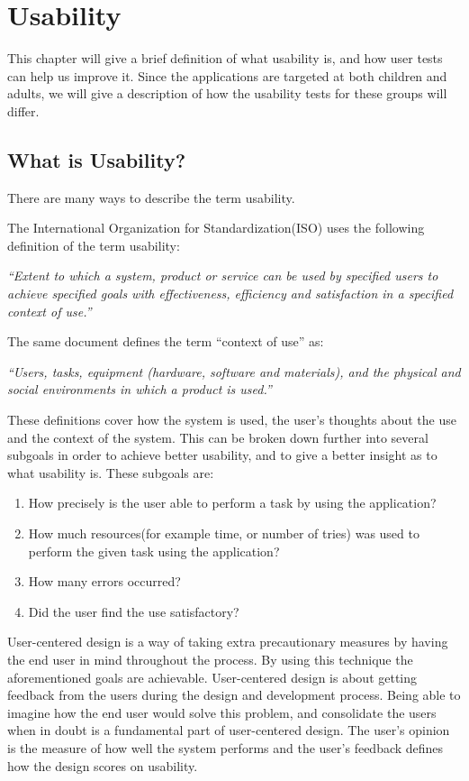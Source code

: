 \chapter{Usability}
\label{chp:usability}

This chapter will give a brief definition of what usability is, and how user tests can help us improve it. Since the applications are targeted at both children and adults, we will give a description of how the usability tests for these groups will differ.

\section{What is Usability?}
\label{sec:usability}
There are many ways to describe the term usability. 

The International Organization for Standardization(ISO) uses the following definition of the term usability\cite{isousability}:

\textit{``Extent to which a system, product or service can be used by specified
users to achieve specified goals with effectiveness, efficiency
and satisfaction in a specified context of use.''}

The same document defines the term ``context of use'' as:

\textit{``Users, tasks, equipment (hardware, software and materials), and
the physical and social environments in which a product is used.''}

These definitions cover how the system is used, the user's thoughts about the use and the context of the system. This can be broken down further into several subgoals in order to achieve better usability, and to give a better insight as to what usability is. 
These subgoals are:

\begin{enumerate}
\item{How precisely is the user able to perform a task by using the application?}
\item{How much resources(for example time, or number of tries) was used to perform the given task using the application?}
\item{How many errors occurred?}
\item{Did the user find the use satisfactory?}
\end{enumerate}

User-centered design is a way of taking extra precautionary measures by having the end user in mind throughout the process. By using this technique the aforementioned goals are achievable. User-centered design is about getting feedback from the users during the design and development process. Being able to imagine how the end user would solve this problem, and consolidate the users when in doubt is a fundamental part of user-centered design. The user's opinion is the measure of how well the system performs and the user's feedback defines how the design scores on usability.


